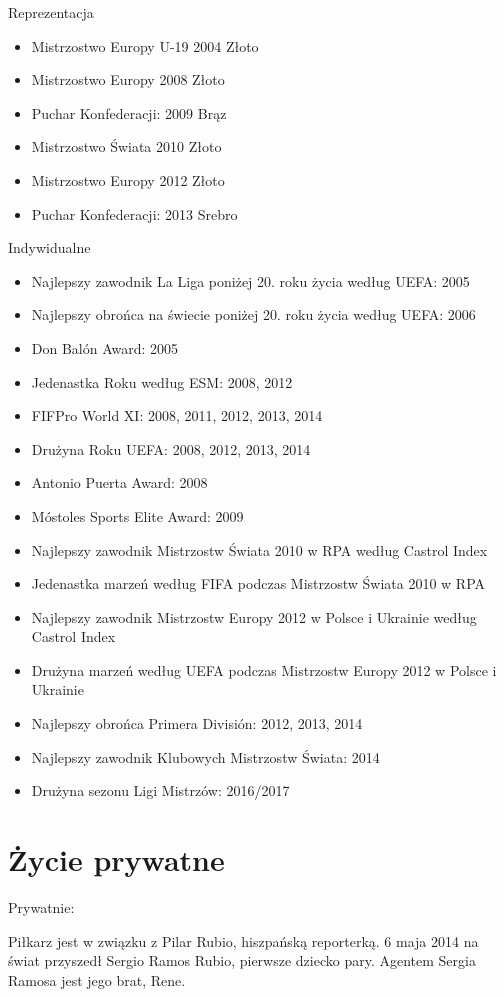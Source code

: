 \documentclass{beamer}
\begin{document}
\begin{frame}{Reprezentacja}
\begin{itemize}
\item Mistrzostwo Europy U-19 2004  Złoto
\item Mistrzostwo Europy 2008  Złoto
\item Puchar Konfederacji: 2009 Brąz
\item Mistrzostwo Świata 2010 Złoto
\item Mistrzostwo Europy 2012 Złoto
\item Puchar Konfederacji: 2013 Srebro
\end{itemize}
\end{frame}

\begin{frame}{Indywidualne}
\begin{itemize}
\item Najlepszy zawodnik La Liga poniżej 20. roku życia według UEFA: 2005
\item Najlepszy obrońca na świecie poniżej 20. roku życia według UEFA: 2006
\item Don Balón Award: 2005
\item Jedenastka Roku według ESM: 2008, 2012
\item FIFPro World XI: 2008, 2011, 2012, 2013, 2014
\item Drużyna Roku UEFA: 2008, 2012, 2013, 2014
\item Antonio Puerta Award: 2008
\item Móstoles Sports Elite Award: 2009
\item Najlepszy zawodnik Mistrzostw Świata 2010 w RPA według Castrol Index
\item Jedenastka marzeń według FIFA podczas Mistrzostw Świata 2010 w RPA
\item Najlepszy zawodnik Mistrzostw Europy 2012 w Polsce i Ukrainie według Castrol Index
\item Drużyna marzeń według UEFA podczas Mistrzostw Europy 2012 w Polsce i Ukrainie
\item Najlepszy obrońca Primera División: 2012, 2013, 2014
\item Najlepszy zawodnik Klubowych Mistrzostw Świata: 2014
\item Drużyna sezonu Ligi Mistrzów: 2016/2017
\end{itemize}
\end{frame}

\section{Życie prywatne}
\begin{frame}{Prywatnie:}
\begin{itemize}
Piłkarz jest w związku z Pilar Rubio, hiszpańską reporterką. 6 maja 2014 na świat przyszedł Sergio Ramos Rubio, pierwsze dziecko pary. Agentem Sergia Ramosa jest jego brat, Rene.


\end{itemize}
\end{frame}
\end{document}

